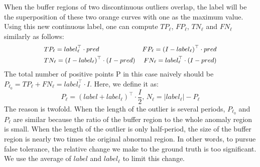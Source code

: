 \noindent When the buffer regions of two discontinuous outliers overlap, the label will be the superposition of these two orange curves with one as the maximum value. Using this new continuous label, one can compute $TP_\ell$, $FP_\ell$, $TN_\ell$ and $FN_\ell$ similarly as follows:
\begin{equation}
{\small
\begin{split}
&TP_{\ell} = label_{\ell}^\top \cdot pred &FP_{\ell} = (I- label_{\ell})^\top \cdot pred \\
&TN_{\ell} = (I- label_{\ell})^\top \cdot (I-pred) &FN_{\ell} = label_{\ell}^\top \cdot (I-pred) \\
\end{split}
} %
\end{equation}
\noindent The total number of positive points P in this case naively should be $P_{{\ell}_0} = TP_{\ell}+ FN_{\ell} = label_{\ell}^\top \cdot I$. Here, we define it as:
\begin{equation}
P_{\ell} = (label+label_{\ell})^\top \cdot \frac{I}{2} \text{, } N_{\ell} = |label_{\ell}|-P_{\ell}
\end{equation}
\noindent The reason is twofold. When the length of the outlier is several periods, $P_{{\ell}_0}$ and $P_{\ell}$ are similar because the ratio of the buffer region to the whole anomaly region is small. When the length of the outlier is only half-period, the size of the buffer region is nearly two times the original abnormal region. In other words, to pursue false tolerance, the relative change we make to the ground truth is too significant. We use the average of $label$ and $label_{\ell}$ to limit this change.

